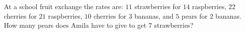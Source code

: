 At a school fruit exchange the rates are: $11$ strawberries for $14$ raspberries, $22$ cherries for $21$ raspberries, $10$ cherries for $3$ bananas, and $5$ pears for $2$ bananas. How many pears does Amila have to give to get $7$ strawberries?
